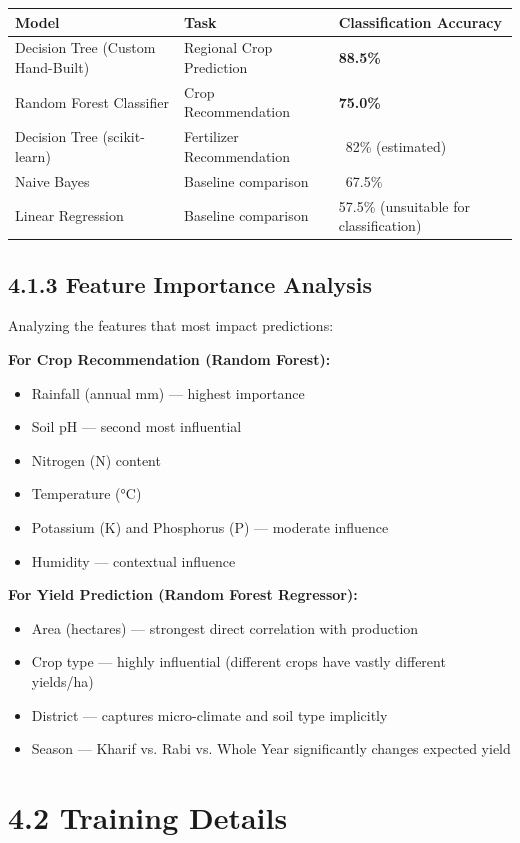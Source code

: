 \documentclass[12pt,a4paper]{report}
\begin{document}
\begin{table}[h!]
\centering
\begin{tabular}{|l|l|l|}
\hline
Model & Task & Classification Accuracy \\ \hline
Decision Tree (Custom Hand-Built) & Regional Crop Prediction & \textbf{88.5\%} \\ \hline
Random Forest Classifier & Crop Recommendation & \textbf{75.0\%} \\ \hline
Decision Tree (scikit-learn) & Fertilizer Recommendation & ~82\% (estimated) \\ \hline
Naive Bayes & Baseline comparison & ~67.5\% \\ \hline
Linear Regression & Baseline comparison & 57.5\% (unsuitable for classification) \\ \hline
\end{tabular}
\end{table}

\subsection{4.1.3 Feature Importance Analysis}

Analyzing the features that most impact predictions:

\textbf{For Crop Recommendation (Random Forest):}
\begin{itemize}
\item Rainfall (annual mm) — highest importance
\item Soil pH — second most influential
\item Nitrogen (N) content
\item Temperature (°C)
\item Potassium (K) and Phosphorus (P) — moderate influence
\item Humidity — contextual influence
\end{itemize}
\textbf{For Yield Prediction (Random Forest Regressor):}
\begin{itemize}
\item Area (hectares) — strongest direct correlation with production
\item Crop type — highly influential (different crops have vastly different yields/ha)
\item District — captures micro-climate and soil type implicitly
\item Season — Kharif vs. Rabi vs. Whole Year significantly changes expected yield
\end{itemize}
\section{4.2 Training Details}
\end{document}
